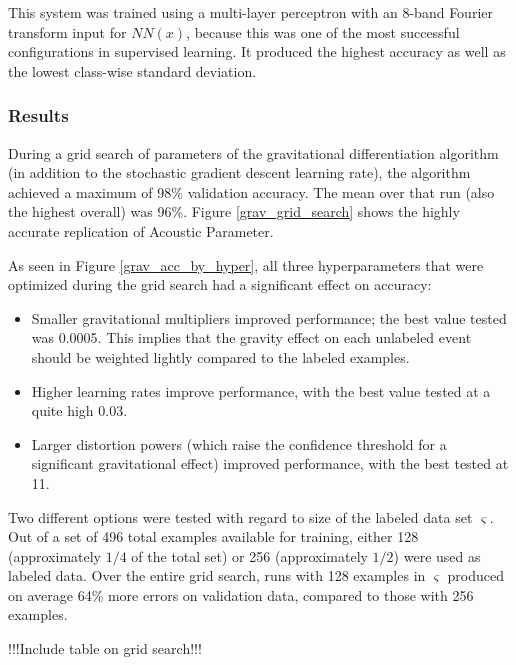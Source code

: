 \documentclass[10pt]{article}
\begin{document}
This system was trained using a multi-layer perceptron with an 8-band Fourier transform input for $NN(x)$, because this was one of the most successful configurations in supervised learning. It produced the highest accuracy as well as the lowest class-wise standard deviation.

\subsubsection{Results}

During a grid search of parameters of the gravitational differentiation algorithm (in addition to the stochastic gradient descent learning rate), the algorithm achieved a maximum of 98\% validation accuracy. The mean over that run (also the highest overall) was 96\%. Figure \ref{grav_grid_search} shows the highly accurate replication of Acoustic Parameter.

As seen in Figure \ref{grav_acc_by_hyper}, all three hyperparameters that were optimized during the grid search had a significant effect on accuracy:

\begin{itemize}
    \item Smaller gravitational multipliers improved performance; the best value tested was 0.0005. This implies that the gravity effect on each unlabeled event should be weighted lightly compared to the labeled examples.
    \item Higher learning rates improve performance, with the best value tested at a quite high 0.03.
    \item Larger distortion powers (which raise the confidence threshold for a significant gravitational effect) improved performance, with the best tested at 11.
\end{itemize}

Two different options were tested with regard to size of the labeled data set $\varsigma$. Out of a set of 496 total examples available for training, either 128 (approximately $1/4$ of the total set) or 256 (approximately $1/2$) were used as labeled data. Over the entire grid search, runs with 128 examples in $\varsigma$ produced on average 64\% more errors on validation data, compared to those with 256 examples.

!!!Include table on grid search!!!
\end{document}
